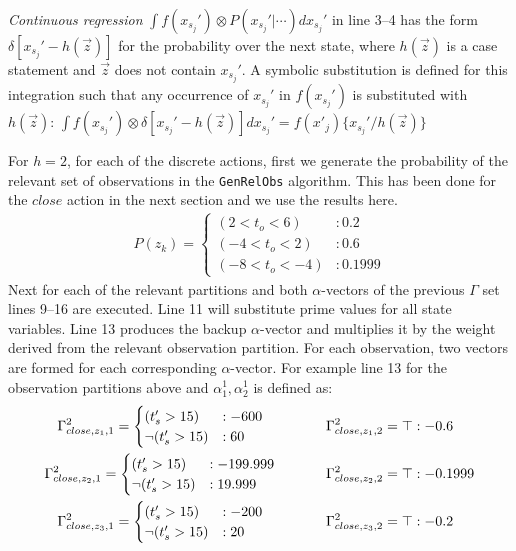 \documentclass{article} %
\begin{document}
\emph{Continuous regression} $\int f(x_{s_j}') \otimes P(x_{s_j}'|\cdots) dx_{s_j}'$ in line 3--4 has the form $\delta[x_{s_j}' - h(\vec{z})]$ for the probability over the next state, where $h(\vec{z})$ is a case statement and $\vec{z}$ does not contain
$x_{s_j}'$.  A symbolic substitution is defined for this integration such that any occurrence of $x_{s_j}'$ in $f(x_{s_j}')$ is substituted with $h(\vec{z})$: 
$\int f(x_{s_j}') \otimes \delta[x_{s_j}' - h(\vec{z})] dx_{s_j}' = f(x'_j) \{ x_{s_j}' / h(\vec{z}) \}$

For $h=2$, for each of the discrete actions, first we generate the probability of the relevant set of observations in the \texttt{GenRelObs} algorithm. This has been done for the $close$ action in the next section and we use the results here. 
\begin{align}
P(z_k)=
\begin{cases}
 (2<t_o<6) &: 0.2 \\
(-4<t_o<2) &: 0.6\\
(-8<t_o<-4) &:0.1999
\end{cases} 
\nonumber
\end{align}
Next for each of the relevant partitions and both $\alpha$-vectors of the previous $\Gamma$ set lines 9--16 are executed. Line 11 will substitute prime values for all state variables. Line 13 produces the backup $\alpha$-vector and multiplies it by the weight derived from the relevant observation partition. For each observation, two vectors are formed for each corresponding $\alpha$-vector. For example line 13 for the observation partitions above and $\alpha_1^1,\alpha_2^1$ is defined as:
\begin{align*}
\Gamma_{close,z_1,1}^2= 
\begin{cases} 
(t_s'>15) &: -600 \\ 
\neg(t_s'>15) &: 60 \\
\end{cases}
\hspace{15mm} 
\Gamma_{close,z_1,2}^2= \top &:-0.6
\\
\Gamma_{close,z_2,1}^2= 
\begin{cases}
(t_s'>15) &: -199.999 \\ 
\neg(t_s'>15) &: 19.999 
\end{cases}
\hspace{12mm} 
\Gamma_{close,z_2,2}^2= \top &:-0.1999
\\
\Gamma_{close,z_3,1}^2= 
\begin{cases}
(t_s'>15) &: -200 \\ 
\neg(t_s'>15) &: 20 
\end{cases}
\hspace{15mm} 
\Gamma_{close,z_3,2}^2= \top &:-0.2
\end{align*}
\end{document}
